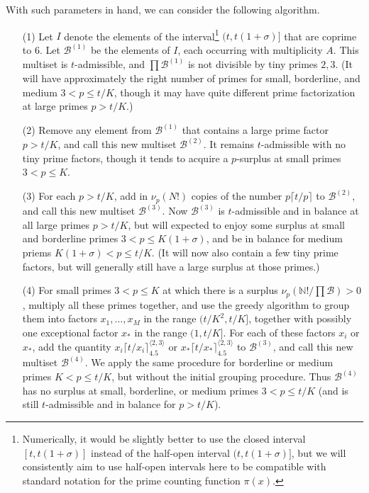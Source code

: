 \documentclass[12pt,a4paper,reqno]{amsart}
\numberwithin{equation}{section}
\theoremstyle{plain}
\theoremstyle{definition}
\newcommand\N{\mathbb{N}}
\newcommand\tuple{{\mathcal B}}
\begin{document}
With such parameters in hand, we can consider the following algorithm.


\begin{enumerate}
\item[(1)] Let $I$ denote the elements of the interval\footnote{Numerically, it would be slightly better to use the closed interval $[t,t(1+\sigma)]$ instead of the half-open interval $(t,t(1+\sigma)]$, but we will consistently aim to use half-open intervals here to be compatible with standard notation for the prime counting function $\pi(x)$.} $(t,t(1+\sigma)]$ that are coprime to $6$.  Let $\tuple^{(1)}$ be the elements of $I$, each occurring with multiplicity $A$.  This multiset is $t$-admissible, and $\prod \tuple^{(1)}$ is not divisible by tiny primes $2,3$.  (It will have approximately the right number of primes for small, borderline, and medium $3 < p \leq t/K$, though it may have quite different prime factorization at large primes $p>t/K$.)
\item[(2)] Remove any element from $\tuple^{(1)}$ that contains a large prime factor $p > t/K$, and call this new multiset $\tuple^{(2)}$.  It remains $t$-admissible with no tiny prime factors, though it tends to acquire a $p$-surplus at small primes $3 < p \leq K$.
\item[(3)] For each $p > t/K$, add in $\nu_p(N!)$ copies of the number $p \lceil t/p \rceil$ to $\tuple^{(2)}$, and call this new multiset $\tuple^{(3)}$.   Now $\tuple^{(3)}$ is $t$-admissible and in balance at all large primes $p>t/K$, but will expected to enjoy some surplus at small and borderline primes $3 < p \leq K(1+\sigma)$, and be in balance for medium priems $K(1+\sigma) < p \leq t/K$.  (It will now also contain a few tiny prime factors, but will generally still have a large surplus at those primes.)
\item [(4)] For small primes $3 < p \leq K$ at which there is a surplus $\nu_p(\N!/\prod \tuple) > 0$, multiply all these primes together, and use the greedy algorithm to group them into factors $x_1, \dots, x_M$ in the range
$(t/K^2, t/K]$, together with possibly one exceptional factor $x_*$ in the range $(1, t/K]$.  For each of these factors $x_i$ or $x_*$, add the quantity $x_i \lceil t/x_i \rceil^{\langle 2,3 \rangle}_{4.5}$ or $x_* \lceil t/x_* \rceil^{\langle 2,3 \rangle}_{4.5}$ to $\tuple^{(3)}$, and call this new multiset $\tuple^{(4)}$.  We apply the same procedure for borderline or medium primes $K < p \leq t/K$, but without the initial grouping procedure. Thus $\tuple^{(4)}$ has no surplus at small, borderline, or medium primes $3 < p \leq t/K$ (and is still $t$-admissible and in balance for $p>t/K$).

\end{enumerate}
\end{document}
